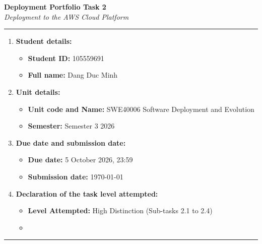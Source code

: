 \documentclass[11pt,a4paper]{article}
\begin{document}
\begin{center}
    {\LARGE \textbf{Deployment Portfolio Task 2}}\\[0.2cm]
    {\large \textit{Deployment to the AWS Cloud Platform}}\\[0.1cm]
\end{center}

\noindent\rule{\textwidth}{1pt}\par\vspace{0.2cm}
\begin{enumerate}
    \item \textbf{Student details:}
    \begin{itemize}
        \item \textbf{Student ID:} 105559691
        \item \textbf{Full name:} Dang Duc Minh
    \end{itemize}
    \item \textbf{Unit details:}
    \begin{itemize}
        \item \textbf{Unit code and Name:} SWE40006 Software Deployment and Evolution
        \item \textbf{Semester:} Semester 3 2026
    \end{itemize}
    \item \textbf{Due date and submission date:}
    \begin{itemize}
        \item \textbf{Due date:} 5 October 2026, 23:59
        \item \textbf{Submission date:} \today
    \end{itemize}
    \item \textbf{Declaration of the task level attempted:}
    \begin{itemize}
        \item \textbf{Level Attempted:} High Distinction (Sub-tasks 2.1 to 2.4)
        \item \textbf{}
    \end{itemize}
\end{enumerate}
\noindent\rule{\textwidth}{1pt}

\newpage

\end{document}

